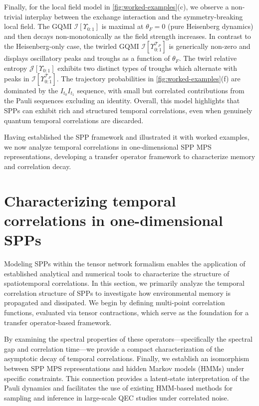 \documentclass[
    aps,
    prx,
    reprint,
    superscriptaddress,
    longbibliography,
    nofootinbib,
    floatfix,
]{revtex4-2}
\begin{document}
Finally, for the local field model in \cref{fig:worked-examples}(c), we observe a non-trivial interplay between the exchange interaction and the symmetry-breaking local field. The GQMI \(\mathcal{I}[\Upsilon_{0:1}]\) is maximal at \(\theta_F = 0\) (pure Heisenberg dynamics) and then decays non-monotonically as the field strength increases. In contrast to the Heisenberg-only case, the twirled GQMI \(\mathcal{I}[\Upsilon_{0:1}^{\mathcal{T}_P}]\) is generically non-zero and displays oscillatory peaks and troughs as a function of \(\theta_F\). The twirl relative entropy \(\mathcal{J}[\Upsilon_{0:1}]\) exhibits two distinct types of troughs which alternate with peaks in \(\mathcal{I}[\Upsilon_{0:1}^{\mathcal{T}_P}]\). The trajectory probabilities in \cref{fig:worked-examples}(f) are dominated by the \(I_{t_0}I_{t_1}\) sequence, with small but correlated contributions from the Pauli sequences excluding an identity. Overall, this model highlights that SPPs can exhibit rich and structured temporal correlations, even when genuinely quantum temporal correlations are discarded.

Having established the SPP framework and illustrated it with worked examples, we now analyze temporal correlations in one-dimensional SPP MPS representations, developing a transfer operator framework to characterize memory and correlation decay.

\section{Characterizing temporal correlations in one-dimensional SPPs}\label{sec:correlation-structure}
Modeling SPPs within the tensor network formalism enables the application of established analytical and numerical tools to characterize the structure of spatiotemporal correlations. In this section, we primarily analyze the temporal correlation structure of SPPs to investigate how environmental memory is propagated and dissipated. We begin by defining multi-point correlation functions, evaluated via tensor contractions, which serve as the foundation for a transfer operator-based framework.

By examining the spectral properties of these operators---specifically the spectral gap and correlation time---we provide a compact characterization of the asymptotic decay of temporal correlations. Finally, we establish an isomorphism between SPP MPS representations and hidden Markov models (HMMs) under specific constraints. This connection provides a latent-state interpretation of the Pauli dynamics and facilitates the use of existing HMM-based methods for sampling and inference in large-scale QEC studies under correlated noise.
\end{document}
